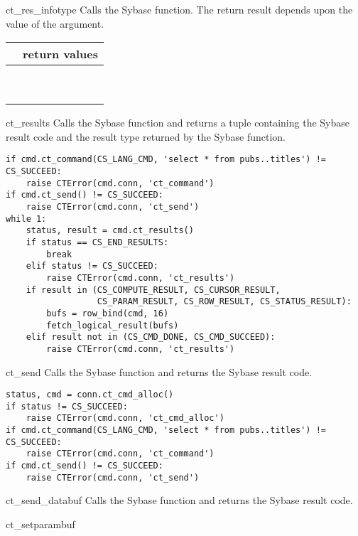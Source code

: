 \begin{methoddesc}[CS_COMMAND]{ct_res_info}{type}
Calls the Sybase  function.  The return result
depends upon the value of the  argument.

\begin{longtable}{l|l}
\var{type} & return values \\
\hline
\code{CS_BROWSE_INFO}   & \code{status, bool} \\
\code{CS_CMD_NUMBER}    & \code{status, int} \\
\code{CS_MSGTYPE}       & \code{status, int} \\
\code{CS_NUM_COMPUTES}  & \code{status, int} \\
\code{CS_NUMDATA}       & \code{status, int} \\
\code{CS_NUMORDER_COLS} & \code{status, int} \\
\code{CS_ORDERBY_COLS}  & \code{status, list of int} \\
\code{CS_ROW_COUNT}     & \code{status, int} \\
\code{CS_TRANS_STATE}   & \code{status, int} \\
\end{longtable}
\end{methoddesc}

\begin{methoddesc}[CS_COMMAND]{ct_results}{}
Calls the Sybase  function and returns a tuple
containing the Sybase result code and the result type returned by the
Sybase function.

\begin{verbatim}
if cmd.ct_command(CS_LANG_CMD, 'select * from pubs..titles') != CS_SUCCEED:
    raise CTError(cmd.conn, 'ct_command')
if cmd.ct_send() != CS_SUCCEED:
    raise CTError(cmd.conn, 'ct_send')
while 1:
    status, result = cmd.ct_results()
    if status == CS_END_RESULTS:
        break
    elif status != CS_SUCCEED:
        raise CTError(cmd.conn, 'ct_results')
    if result in (CS_COMPUTE_RESULT, CS_CURSOR_RESULT,
                  CS_PARAM_RESULT, CS_ROW_RESULT, CS_STATUS_RESULT):
        bufs = row_bind(cmd, 16)
        fetch_logical_result(bufs)
    elif result not in (CS_CMD_DONE, CS_CMD_SUCCEED):
        raise CTError(cmd.conn, 'ct_results')
\end{verbatim}
\end{methoddesc}

\begin{methoddesc}[CS_COMMAND]{ct_send}{}
Calls the Sybase  function and returns the Sybase
result code.

\begin{verbatim}
status, cmd = conn.ct_cmd_alloc()
if status != CS_SUCCEED:
    raise CTError(cmd.conn, 'ct_cmd_alloc')
if cmd.ct_command(CS_LANG_CMD, 'select * from pubs..titles') != CS_SUCCEED:
    raise CTError(cmd.conn, 'ct_command')
if cmd.ct_send() != CS_SUCCEED:
    raise CTError(cmd.conn, 'ct_send')
\end{verbatim}
\end{methoddesc}

\begin{methoddesc}[CS_COMMAND]{ct_send_data}{buf}
Calls the Sybase  function and returns the
Sybase result code.
\end{methoddesc}

\begin{methoddesc}[CS_COMMAND]{ct_setparam}{buf}
\end{methoddesc}
